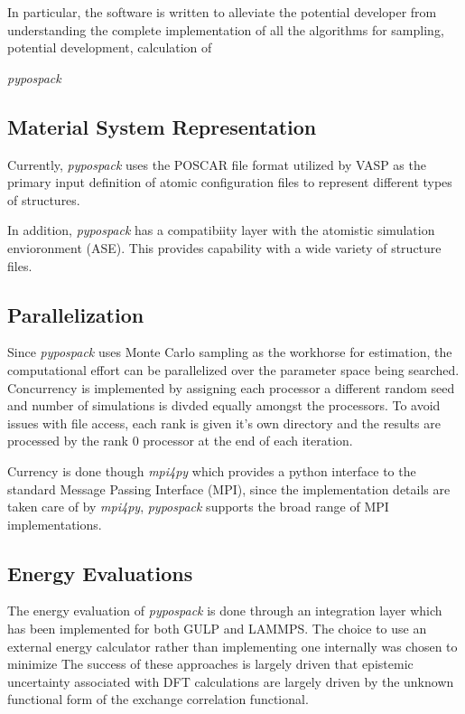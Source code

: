 In particular, the software is written to alleviate the potential developer from understanding the complete implementation of all the algorithms for sampling, potential development, calculation of


\emph{pypospack}
\subsection{Material System Representation}

Currently, \emph{pypospack} uses the POSCAR file format utilized by VASP as the primary input definition of atomic configuration files to represent different types of structures.

In addition, \emph{pypospack} has a compatibiity layer with the atomistic simulation envioronment (ASE).  This provides capability with a wide variety of structure files.

\subsection{Parallelization}

Since \emph{pypospack} uses Monte Carlo sampling as the workhorse for estimation, the computational effort can be parallelized over the parameter space being searched.  Concurrency is implemented by assigning each processor a different random seed and number of simulations is divded equally amongst the processors.  To avoid issues with file access, each rank is given it's own directory and the results are processed by the rank $0$ processor at the end of each iteration.

Currency is done though \emph{mpi4py} which provides a python interface to the standard Message Passing Interface (MPI), since the implementation details are taken care of by \emph{mpi4py}, \emph{pypospack} supports the broad range of MPI implementations.

\subsection{Energy Evaluations}

The energy evaluation of \emph{pypospack} is done through an integration layer which has been implemented for both GULP and LAMMPS.  The choice to use an external energy calculator rather than implementing one internally was chosen to minimize
The success of these approaches is largely driven that epistemic uncertainty associated with DFT calculations are largely driven by the unknown functional form of the exchange correlation functional.

